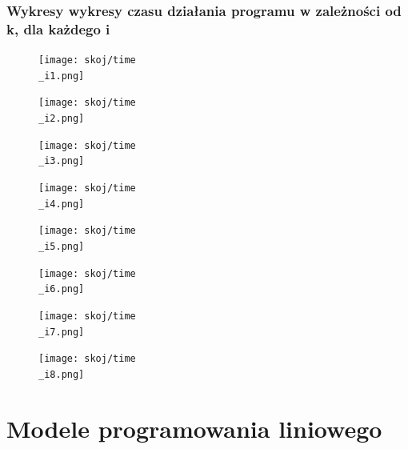 \documentclass{article}
\begin{document}
\subsubsection*{Wykresy wykresy czasu działania programu w zależności od k, dla każdego i}
\begin{figure}[H]
\centering
\begin{minipage}{0.45\textwidth}
\centering
\texttt{[image: skoj/time\\\_i1.png]}
\end{minipage}
\hfill
\begin{minipage}{0.45\textwidth}
\centering
\texttt{[image: skoj/time\\\_i2.png]}
\end{minipage}
\end{figure}
\begin{figure}[H]
\centering
\begin{minipage}{0.45\textwidth}
\centering
\texttt{[image: skoj/time\\\_i3.png]}
\end{minipage}
\hfill
\begin{minipage}{0.45\textwidth}
\centering
\texttt{[image: skoj/time\\\_i4.png]}
\end{minipage}
\end{figure}
\begin{figure}[H]
\centering
\begin{minipage}{0.45\textwidth}
\centering
\texttt{[image: skoj/time\\\_i5.png]}
\end{minipage}
\hfill
\begin{minipage}{0.45\textwidth}
\centering
\texttt{[image: skoj/time\\\_i6.png]}
\end{minipage}
\end{figure}
\begin{figure}[H]
\centering
\begin{minipage}{0.45\textwidth}
\centering
\texttt{[image: skoj/time\\\_i7.png]}
\end{minipage}
\hfill
\begin{minipage}{0.45\textwidth}
\centering
\texttt{[image: skoj/time\\\_i8.png]}
\end{minipage}
\end{figure}

\section*{Modele programowania liniowego}
\end{document}
